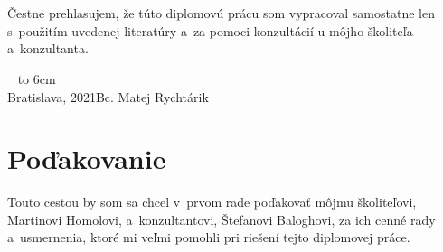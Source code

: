\documentclass[12pt, a4paper, oneside]{book}
\newcommand\mfauthor{Bc. Matej Rychtárik}
\newcommand\mfplacedate{Bratislava, 2021}
\begin{document}


\thispagestyle{empty}

%

{~}\vspace{12cm}

\noindent
\begin{minipage}{0.25\textwidth}~\end{minipage}
\begin{minipage}{0.75\textwidth}
Čestne prehlasujem, že túto diplomovú prácu som vypracoval samostatne len s~použitím uvedenej literatúry a~za pomoci konzultácií u môjho školiteľa a~konzultanta.
\newline \newline
\end{minipage}
\vfill
~ \hfill {\hbox to 6cm{\dotfill}} \\
\mfplacedate \hfill \mfauthor
\vfill\eject 

\chapter*{Poďakovanie}\label{chap:thank_you}
Touto cestou by som sa chcel v~prvom rade poďakovať môjmu školiteľovi, Martinovi Homolovi, a~konzultantovi, Štefanovi Baloghovi, za ich cenné rady a~usmernenia, ktoré mi veľmi pomohli pri riešení tejto diplomovej práce. 
\vfill\eject 
\end{document}
